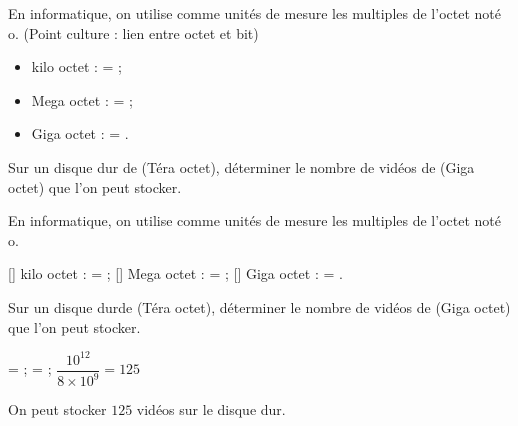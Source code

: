 \begin{exercice*}
    En informatique, on utilise comme unités de mesure les multiples de l’octet noté o. (Point culture : lien entre octet et bit)
    \begin{itemize}
        \item kilo octet :  = ;
        \item Mega octet :  = ;
        \item Giga octet :  = .
    \end{itemize}
Sur un disque dur de  (Téra octet), déterminer le nombre de vidéos de  (Giga octet)
que l'on peut stocker.
    
\end{exercice*}
\begin{corrige}
    En informatique, on utilise comme unités de mesure les multiples de l’octet noté o.

    \begin{itemize}
        \def\item{}
        \item[] kilo octet :  = ;
        \item[] Mega octet :  = ;
        \item[] Giga octet :  = .
    \end{itemize}

    Sur un disque durde  (Téra octet), déterminer le nombre de vidéos de  (Giga octet)
    que l'on peut stocker.

    {\red
     = ;  = ; $\dfrac{10^{12}}{8\times 10^9} = 125$
    
    On peut stocker $125$ vidéos sur le disque dur.
    }
\end{corrige}

